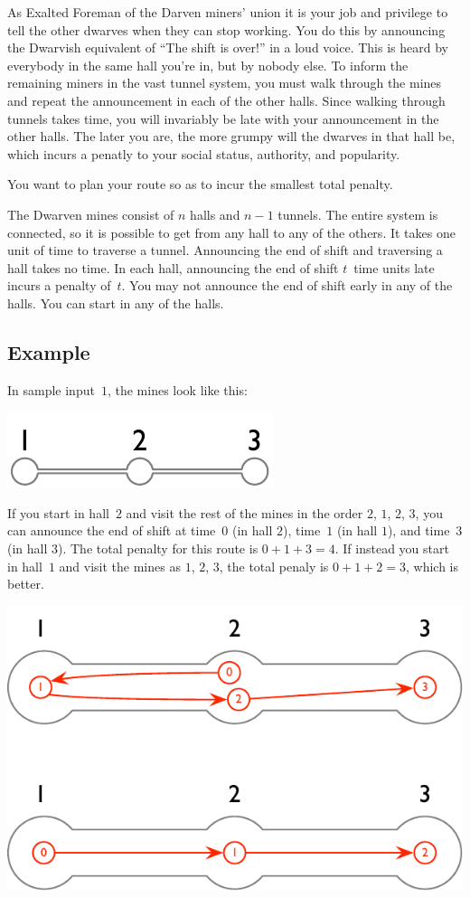 
As Exalted Foreman of the Darven miners' union it is your job and privilege to tell the other dwarves when they can stop working.
You do this by announcing the Dwarvish equivalent of “The shift is over!” in a loud voice.
This is heard by everybody in the same hall you're in, but by nobody else.
To inform the remaining miners in the vast tunnel system, you must walk through the mines and repeat the announcement in each of the other halls.
Since walking through tunnels takes time,
you will invariably be late with your announcement in the other halls.
The later you are, the more grumpy will the dwarves in that hall be, which incurs a penatly to your social status, authority, and popularity.

You want to plan your route so as to incur the smallest total penalty. 

\medskip
The Dwarven mines consist of $n$ halls and $n-1$ tunnels.
The entire system is connected, so it is possible to get from any hall to any of the others.
It takes one unit of time to traverse a tunnel.
Announcing the end of shift and traversing a hall takes no time.
In each hall, announcing the end of shift $t$~time units late incurs a penalty of~$t$.
You may not announce the end of shift early in any of the halls.
You can start in any of the halls.

\subsection*{Example}

In sample input~$1$, the mines look like this:

\includegraphics[width=.15\textwidth]{img/sample-1.pdf}

If you start in hall~$2$ and visit the rest of the mines in the order $2$, $1$, $2$, $3$, you can announce the end of shift at time~$0$ (in hall $2$), time~$1$ (in hall $1$), and time~$3$ (in hall $3$).
The total penalty for this route is $0+1+3=4$.
If instead you start in hall~$1$ and visit the mines as $1$, $2$, $3$, the total penaly is $0+1+2=3$, which is better.

\includegraphics[width=.35\textwidth]{img/sample-1-ans.pdf}

